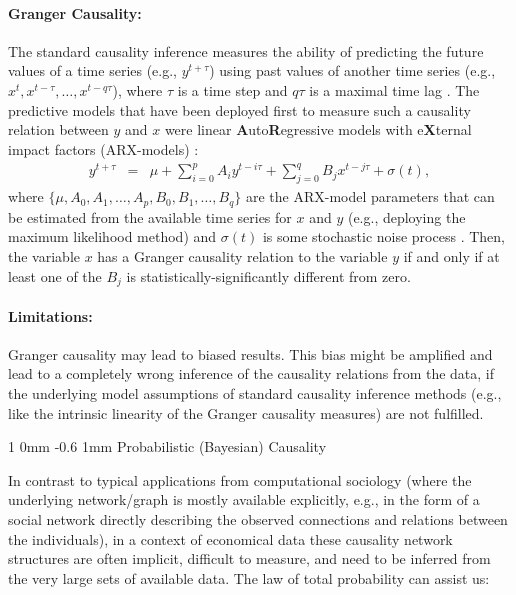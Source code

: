 \documentclass[a0,portrait]{a0poster}
\makeatletter
\renewcommand{\section}{\@startsection
        {section}%
        {1}%
        {0mm}%
        {-0.6\baselineskip}%
        {1mm}%
        {\Large\color{NTNUBlue}\bfseries}}%
\makeatother
\begin{document}
\begin{multicols}{2}
\vspace{-1.0cm}
\paragraph{\large Granger Causality:}  {\large The standard causality inference measures the ability of predicting the future values of a time series (e.g., $y^{t+\tau}$) using past values of another time series (e.g., $x^t,x^{t-\tau},\dots,x^{t-q\tau}$), where $\tau$ is a time step and $q\tau$ is a maximal time lag \cite{granger69}.  The predictive models that have been deployed first to measure such a causality relation between $y$ and $x$ were linear {\bf A}uto{\bf R}egressive models with e{\bf X}ternal impact factors (ARX-models) \cite{brockwell2002}}:
\begin{eqnarray}
\label{eq:ARX}
y^{t+\tau}&=&\mu+\sum_{i=0}^p A_iy^{t-i\tau}+\sum_{j=0}^q B_jx^{t-j\tau}+\sigma\left(t\right),
\end{eqnarray}
{\large where $\{\mu,A_0, A_1,\dots,A_p,B_0, B_1,\dots,B_q\}$ are the ARX-model parameters that can be estimated from the available time series for $x$ and $y$ (e.g., deploying the maximum likelihood method) and $\sigma\left(t\right)$ is some stochastic noise process \cite{brockwell2002}. Then, the variable $x$ has a Granger causality relation to the variable $y$ if and only if at least one of the $B_j$ is statistically-significantly different from zero.}

\paragraph{\large Limitations:} {\large Granger causality may lead to biased results.  This bias might be amplified and lead to a completely wrong inference of the causality relations from the data, if the underlying model assumptions of standard causality inference methods (e.g., like the intrinsic linearity of the Granger causality measures) are not fulfilled.}

\section{Probabilistic (Bayesian) Causality}

{\large In contrast to typical applications from computational sociology (where the underlying network/graph is mostly available explicitly, e.g., in the form of a social network directly describing the observed connections and relations between the individuals), in a context of economical data these causality network structures are often implicit, difficult to measure, and need to be inferred from the very large sets of available data.  The law of total probability can assist us:}


\end{multicols}
\end{document}
